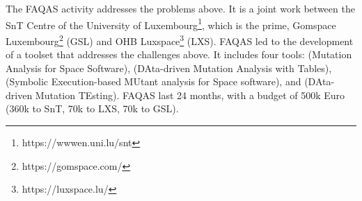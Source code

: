 
The FAQAS activity addresses the problems above. It is a joint work between the SnT Centre of the University of Luxembourg\footnote{https://wwwen.uni.lu/snt}, which is the prime, Gomspace Luxembourg\footnote{https://gomspace.com/} (GSL) and OHB Luxspace\footnote{https://luxspace.lu/} (LXS).
FAQAS led to the development of a toolset that addresses the challenges above. It includes four tools:
 (Mutation Analysis for Space Software), 
 (DAta-driven Mutation Analysis with Tables), 
 (Symbolic Execution-based MUtant analysis for Space software),
and  (DAta-driven Mutation TEsting).
FAQAS last 24 months, with a budget of 500k Euro (360k to SnT, 70k to LXS, 70k to GSL).


